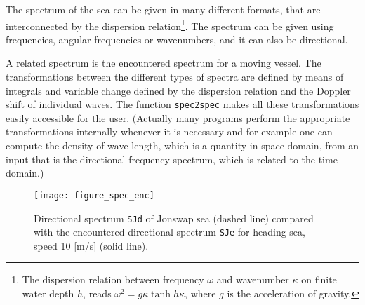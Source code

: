The spectrum of the sea can be given in many different formats,
that are interconnected by the dispersion
relation\footnote{The dispersion relation between frequency
$\omega$ and wavenumber $\kappa$ on finite water depth $h$, reads
$\omega^2=g \kappa \tanh h\kappa$, where $g$ is the acceleration of gravity.}.
The spectrum can be given using
frequencies, angular frequencies or wavenumbers, and it
can also be directional.

A related spectrum is the encountered spectrum for a moving vessel. The
transformations between the different types of spectra
are defined by means of integrals and variable change defined by the
dispersion relation
and the Doppler shift of individual waves.
The function {\tt spec2spec}
makes all these transformations easily
accessible for the user. (Actually many programs perform
the appropriate transformations internally whenever it is necessary
and for example one can compute the density of wave-length,
which is a quantity in space domain, from an
input that is the directional frequency spectrum, which is related to the
time domain.)

\begin{figure}[tbh]
\centering
\texttt{[image: figure\_spec\_enc]}
\vspace{-3mm}
\caption[Example of directional spectra]{
Directional spectrum {\tt SJd} of {\sc Jonswap} sea (dashed line)
 compared with the encountered directional spectrum {\tt SJe} for heading sea,
 speed 10 [m/s] (solid line).}
  \label{fig4-5}
\end{figure}

